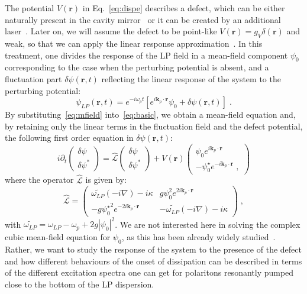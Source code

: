 The potential $V(\bm{r})$ in Eq.~\eqref{eq:dispe} describes a
defect, which can be either naturally present in the cavity
mirror~\cite{Amo_2009} or it can be created by an additional
laser~\cite{Amo_2010}. Later on, we will assume the defect to be
point-like $V(\bm{r})=g_V \delta(\bm{r})$ and weak, so that we can
apply the linear response approximation~\cite{Astrakharchik_2004}.
%
In this treatment, one divides the response of the LP field in a
mean-field component $\psi_0$ corresponding to the case when the
perturbing potential is absent, and a fluctuation part $\delta \psi
(\bm{r},t)$ reflecting the linear response of the system to the
perturbing potential:
%
\begin{equation}
  \psi_{LP} (\bm{r},t) = e^{-i \omega_p t} \left[e^{i \bm{k}_p
      \cdot \bm{r}} \psi_0 + \delta \psi (\bm{r},t)\right] \; .
\label{eq:mfield}
\end{equation}
%
By substituting~\eqref{eq:mfield} into~\eqref{eq:basic}, we obtain a
mean-field equation and, by retaining only the linear terms in the
fluctuation field and the defect potential, the following first order
equation in $\delta \psi (\bm{r},t)$:
%
\begin{equation}
  i \partial_t \begin{pmatrix} \delta \psi \\ \delta
    \psi^* \end{pmatrix} = \hat{\mathcal{L}} \begin{pmatrix} \delta
    \psi \\ \delta \psi^* \end{pmatrix} + V(\bm{r}) \begin{pmatrix}
    \psi_0 e^{i \bm{k}_p \cdot \bm{r}} \\ -\psi_0^{\star} e^{-i
      \bm{k}_p \cdot \bm{r}}\; ,
    \end{pmatrix}
\label{eq:linre}
\end{equation}
%
where the operator $\hat{\mathcal{L}}$ is given by:
%
\begin{equation}
 \hat{\mathcal{L}} = \begin{pmatrix} \widetilde{\omega_{LP}}
   (-i\nabla) - i \kappa & g \psi_0^2 e^{2 i \bm{k}_p \cdot
     \bm{r}} \\ -g {\psi_0^{\star}}^2 e^{-2 i \bm{k}_p \cdot
     \bm{r}}& - \widetilde{\omega_{LP}}(-i \nabla) -
   i\kappa \end{pmatrix}\; ,
\end{equation}
%
with $\widetilde{\omega_{LP}} = \omega_{LP}-\omega_p + 2g
|\psi_0|^2$. We are not interested here in solving the complex cubic
mean-field equation for $\psi_0$, as this has been already widely
studied~\cite{9780199228942}. Rather, we want to study the response
of the system to the presence of the defect and how different
behaviours of the onset of dissipation can be described in terms of
the different excitation spectra one can get for polaritons resonantly
pumped close to the bottom of the LP dispersion.

